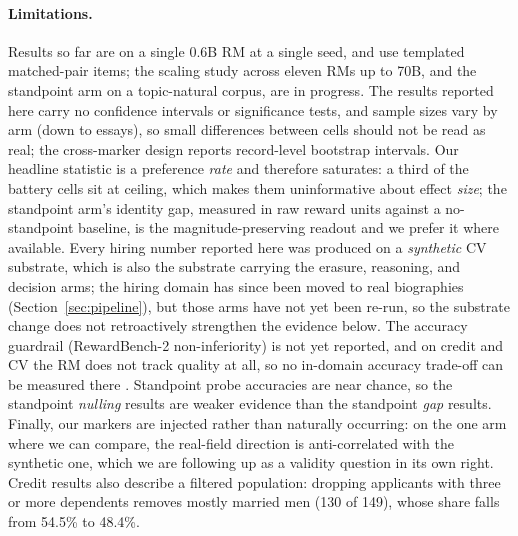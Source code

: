 \paragraph{Limitations.} Results so far are on a single 0.6B RM at a single seed, and use templated
matched-pair items; the scaling study across eleven RMs up to 70B, and the standpoint arm on a topic-natural
corpus, are in progress. The results reported here carry no confidence intervals or significance tests, and
sample sizes vary by arm (down to \nEvalStandpointAsap{} essays), so small differences between cells should not
be read as real; the cross-marker design reports record-level bootstrap intervals. Our headline \autoinf{} statistic is a preference \emph{rate} and therefore saturates: a third of the
battery cells sit at ceiling, which makes them uninformative about effect \emph{size}; the standpoint arm's
identity gap, measured in raw reward units against a no-standpoint baseline, is the magnitude-preserving
readout and we prefer it where available. Every hiring number reported here was produced on a \emph{synthetic}
CV substrate, which is also the substrate carrying the erasure, reasoning, and decision arms; the hiring domain
has since been moved to real biographies (Section~\ref{sec:pipeline}), but those arms have not yet been re-run,
so the substrate change does not retroactively strengthen the evidence below. The accuracy guardrail
(RewardBench-2 non-inferiority) is not yet reported, and on credit and CV the RM does not track quality at all,
so no in-domain accuracy trade-off can be measured there . Standpoint probe accuracies are near chance, so the standpoint \emph{nulling} results are
weaker evidence than the standpoint \emph{gap} results. Finally, our markers are injected rather than
naturally occurring: on the one arm where we can compare, the real-field direction is anti-correlated with the
synthetic one, which we are following up as a validity question in its own right. 
Credit results also describe a filtered population: dropping applicants with three or more dependents
removes mostly married men (130 of 149), whose share falls from 54.5\% to 48.4\%.
